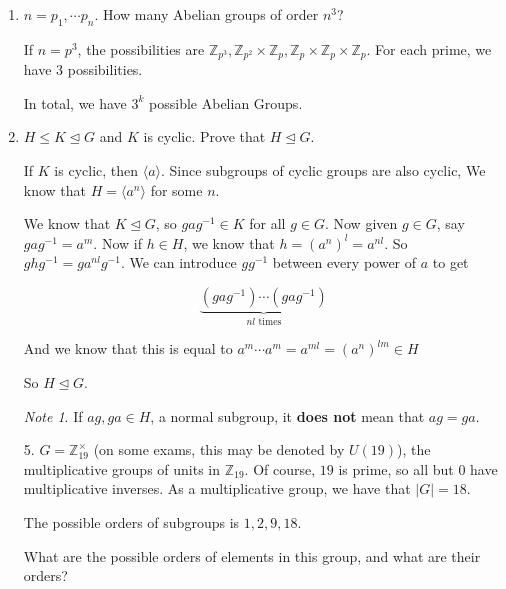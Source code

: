 \documentclass[12pt]{article}
\def\Z{{\mathbb Z}}
\newcommand{\lr}[1]{\langle #1 \rangle}
\theoremstyle{remark}
\theoremstyle{remark}
\theoremstyle{remark}
\theoremstyle{remark}
\theoremstyle{remark}
\newtheorem*{note}{Note}
\begin{document}
\begin{enumerate}
  \item $n = p_1, \cdots p_n$. How many Abelian groups of order $n^3$?

    If $n = p^3$, the possibilities are $\Z_{p^3}, \Z_{p^2} \times \Z_p, \Z_p
    \times \Z_p \times \Z_p$. For each prime, we have $3$ possibilities.

    In total, we have $3^k$ possible Abelian Groups.

  \item $H \le K \trianglelefteq G$ and $K$ is cyclic. Prove that $H
    \trianglelefteq G$.

    If $K$ is cyclic, then $\lr{a}$. Since subgroups of cyclic groups are also
    cyclic, We know that $H = \lr{a^n}$ for some $n$.

    We know that $K \trianglelefteq G$, so $gag^{-1} \in K$ for all $g \in G$.
    Now given $g \in G$, say $gag^{-1} = a^m$. Now if $h \in H$, we know that $h
    = (a^n)^l = a^{nl}$. So $ghg^{-1} = ga^{nl}g^{-1}$. We can introduce
    $gg^{-1}$ between every power of $a$ to get

    \[
      \underbrace{(gag^{-1}) \cdots (gag^{-1})}_{\text{$nl$ times}}
    \]

    And we know that this is equal to $a^m \cdots a^m = a^{ml} = (a^n)^{lm} \in
    H$

    So $H \trianglelefteq G$.

    \begin{note}
      If $ag, ga \in H$, a normal subgroup, it {\bf does not} mean that $ag =
      ga$.
    \end{note}

  \item[5.] $G = \Z^{\times}_{19}$ (on some exams, this may be denoted by
    $U(19)$), the multiplicative groups of units in $\Z_{19}$. Of course, $19$
    is prime, so all but $0$ have multiplicative inverses. As a multiplicative
    group, we have that $|G| = 18$.

    The possible orders of subgroups is $1, 2, 9, 18$.

    What are the possible orders of elements in this group, and what are their
    orders?
\end{enumerate}
\end{document}
